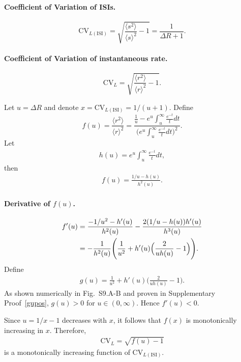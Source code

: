 \documentclass[11pt]{article}
\theoremstyle{remark}
\theoremstyle{definition}
\begin{document}
\paragraph{Coefficient of Variation of ISIs.}
\begin{equation}
\mathrm{CV}_{L(\mathrm{ISI})} = \sqrt{\frac{\langle s^2\rangle}{\langle s\rangle^2}-1}
= \frac{1}{\Delta R + 1}.
\end{equation}

\paragraph{Coefficient of Variation of instantaneous rate.}
\begin{equation}
\mathrm{CV}_L = \sqrt{\frac{\langle r^2\rangle}{\langle r\rangle^2}-1}.
\end{equation}

Let $u=\Delta R$ and denote $x=\mathrm{CV}_{L(\mathrm{ISI})}=1/(u+1)$. Define
\begin{equation}
f(u) = \frac{\langle r^2\rangle}{\langle r\rangle^2}
= \frac{\tfrac{1}{u} - e^u \int_u^\infty \tfrac{e^{-t}}{t} dt}{\big(e^u \int_u^\infty \tfrac{e^{-t}}{t} dt\big)^2}.
\end{equation}
Let
\begin{align}
h(u)=e^u \int_u^\infty \frac{e^{-t}}{t} dt,
\end{align}
then
\begin{align}
f(u)=\frac{1/u - h(u)}{h^2(u)}.
\end{align}

\paragraph{Derivative of $f(u)$.}
\begin{align}
f'(u) &= \frac{-1/u^2 - h'(u)}{h^2(u)} - \frac{2(1/u-h(u))h'(u)}{h^3(u)} \notag \\
&= -\frac{1}{h^2(u)}\Bigg(\frac{1}{u^2}+h'(u)\Big(\frac{2}{uh(u)}-1\Big)\Bigg).
\end{align}
Define
\begin{align}
g(u) = \frac{1}{u^2}+h'(u)\Big(\frac{2}{uh(u)}-1\Big).
\end{align}
As shown numerically in Fig.~S9.A-B and proven in Supplementary Proof~\ref{gupos}, $g(u)>0$ for $u\in(0,\infty)$. Hence $f'(u)<0$.

Since $u=1/x-1$ decreases with $x$, it follows that $f(x)$ is monotonically increasing in $x$. Therefore,
\begin{align}
\mathrm{CV}_L = \sqrt{f(u)-1}
\end{align}
is a monotonically increasing function of $\mathrm{CV}_{L(\mathrm{ISI})}$.
\end{document}
